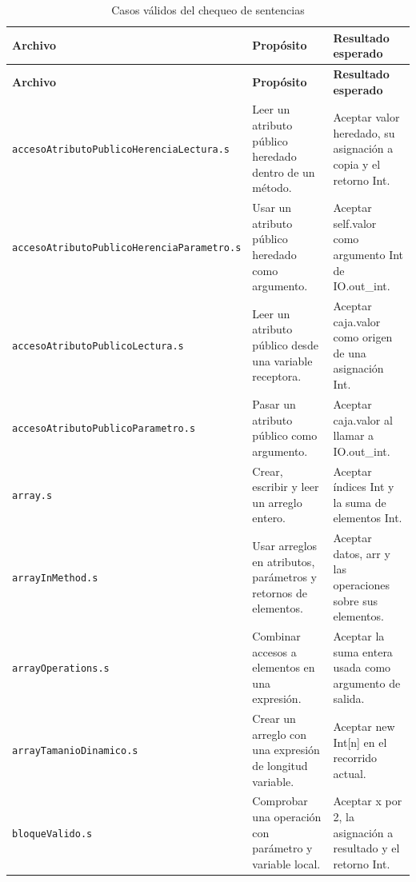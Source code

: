 \begingroup
\small
\renewcommand{\arraystretch}{1.2}
\setlength{\tabcolsep}{5pt}
\setlength{\LTleft}{0pt}
\setlength{\LTright}{0pt}
\begin{longtable}{|>{\raggedright\arraybackslash}p{}|>{\raggedright\arraybackslash}p{}|>{\raggedright\arraybackslash}p{}|}
\caption{Casos válidos del chequeo de sentencias}\label{tab:sentencias-success}\\
\hline
\textbf{Archivo} & \textbf{Propósito} & \textbf{Resultado esperado} \\ \hline
\endfirsthead
\hline
\textbf{Archivo} & \textbf{Propósito} & \textbf{Resultado esperado} \\ \hline
\endhead
\texttt{acceso\allowbreak Atributo\allowbreak Publico\allowbreak Herencia\allowbreak Lectura.s} & Leer un atributo público heredado dentro de un método. & Aceptar valor heredado, su asignación a copia y el retorno Int. \\ \hline
\texttt{acceso\allowbreak Atributo\allowbreak Publico\allowbreak Herencia\allowbreak Parametro.s} & Usar un atributo público heredado como argumento. & Aceptar self.valor como argumento Int de IO.out\_int. \\ \hline
\texttt{acceso\allowbreak Atributo\allowbreak Publico\allowbreak Lectura.s} & Leer un atributo público desde una variable receptora. & Aceptar caja.valor como origen de una asignación Int. \\ \hline
\texttt{acceso\allowbreak Atributo\allowbreak Publico\allowbreak Parametro.s} & Pasar un atributo público como argumento. & Aceptar caja.valor al llamar a IO.out\_int. \\ \hline
\texttt{array.s} & Crear, escribir y leer un arreglo entero. & Aceptar índices Int y la suma de elementos Int. \\ \hline
\texttt{array\allowbreak In\allowbreak Method.s} & Usar arreglos en atributos, parámetros y retornos de elementos. & Aceptar datos, arr y las operaciones sobre sus elementos. \\ \hline
\texttt{array\allowbreak Operations.s} & Combinar accesos a elementos en una expresión. & Aceptar la suma entera usada como argumento de salida. \\ \hline
\texttt{array\allowbreak Tamanio\allowbreak Dinamico.s} & Crear un arreglo con una expresión de longitud variable. & Aceptar new Int[n] en el recorrido actual. \\ \hline
\texttt{bloque\allowbreak Valido.s} & Comprobar una operación con parámetro y variable local. & Aceptar x por 2, la asignación a resultado y el retorno Int. \\ \hline

\end{longtable}
